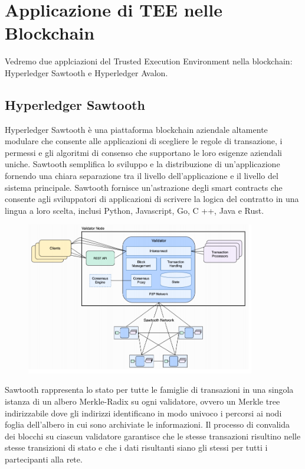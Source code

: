 \section{Applicazione di TEE nelle Blockchain}
Vedremo due applciazioni del Trusted Execution Environment nella blockchain: Hyperledger Sawtooth e Hyperledger Avalon.

\subsection{Hyperledger Sawtooth}
Hyperledger Sawtooth è una piattaforma blockchain aziendale
altamente modulare che consente alle applicazioni di scegliere le
regole di transazione, i permessi e gli algoritmi di consenso che
supportano le loro esigenze aziendali uniche.
Sawtooth semplifica lo sviluppo e la distribuzione di un'applicazione
fornendo una chiara separazione tra il livello dell'applicazione e il livello
del sistema principale.
Sawtooth fornisce un'astrazione
degli smart contracts che
consente agli sviluppatori di
applicazioni di scrivere la logica
del contratto in una lingua a loro
scelta, inclusi Python, Javascript,
Go, C ++, Java e Rust.

\begin{figure}[htb!]
    \centering
    \includegraphics[width=10cm]{./Images/cap6/6.10.png}
\end{figure}

Sawtooth rappresenta lo stato per tutte le famiglie di transazioni in una singola istanza di un
albero Merkle-Radix su ogni validatore, ovvero un Merkle tree indirizzabile dove gli indirizzi
identificano in modo univoco i percorsi ai nodi foglia dell'albero in cui sono archiviate le
informazioni.
Il processo di convalida dei blocchi su ciascun validatore garantisce che le stesse transazioni
risultino nelle stesse transizioni di stato e che i dati risultanti siano gli stessi per tutti i
partecipanti alla rete.

